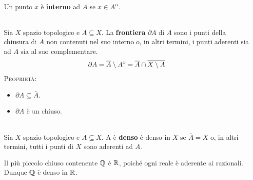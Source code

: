 \begin{define}~{}\\
	Un punto $x$ è \textbf{interno} ad $A$ se $x\in{\kern0ptA}^{\mathrm{o}}$.
\end{define}
\begin{define}[Frontiera.]~{}\\
Sia $X$ spazio topologico e $A\subseteq X$. La \textbf{frontiera} $\partial A$ di $A$ sono i punti della chiusura di $A$ non contenuti nel suo interno o, in altri termini, i punti aderenti sia ad $A$ sia al suo complementare.
\begin{equation}
\partial A=\overline{A}\setminus {\kern0ptA}^{\mathrm{o}}=\overline{A}\cap\overline{X\setminus A}
\end{equation}
\textsc{Proprietà:}
\begin{itemize}
	\item $\partial{A}\subseteq \overline{A}$.
	\item $\partial{A}$ è un chiuso.
\end{itemize}
\vspace{-3mm}
\end{define}
\begin{define}~{}\\
Sia $X$ spazio topologico e $A\subseteq X$. A è \textbf{denso} è denso in $X$ se $\overline{A}=X$ o, in altri termini, tutti i punti di $X$ sono aderenti ad $A$.
\end{define}
\begin{example}
Il più piccolo chiuso contenente $\mathbb{Q}$ è $\mathbb{R}$, poiché ogni reale è aderente ai razionali. Dunque $\mathbb{Q}$ è denso in $\mathbb{R}$.
\end{example}
